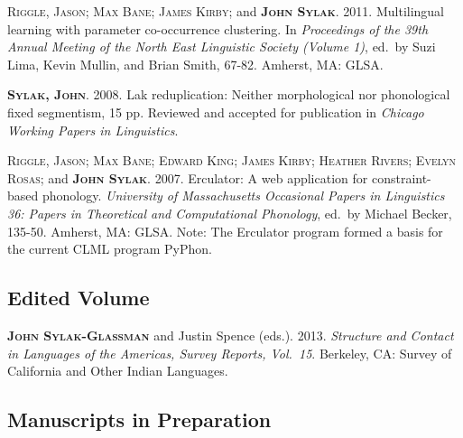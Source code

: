 \documentclass[11pt]{article}
\renewcommand{\bf}[1]{\textbf{#1}}
\newcommand{\ca}[1]{\textsc{#1}}
\renewcommand{\it}[1]{\textit{#1}}
\begin{document}
\begin{reflist}
\ca{Riggle, Jason; Max Bane; James Kirby;} and \ca{\bf{John Sylak}}. 2011. Multilingual learning with parameter co-occurrence clustering. In \it{Proceedings of the 39th Annual Meeting of the North East Linguistic Society (Volume 1)}, ed.~by Suzi Lima, Kevin Mullin, and Brian Smith, 67-82. Amherst, MA: GLSA.

\ca{\bf{Sylak, John}}. 2008. Lak reduplication: Neither morphological nor phonological fixed segmentism, 15 pp. Reviewed and accepted for publication in \it{Chicago Working Papers in Linguistics}.

\ca{Riggle, Jason; Max Bane; Edward King; James Kirby; Heather Rivers; Evelyn Rosas;} and \ca{\bf{John Sylak}}. 2007. Erculator: A web application for constraint-based phonology. \it{University of Massachusetts Occasional Papers in Linguistics 36: Papers in Theoretical and Computational Phonology}, ed.~by Michael Becker, 135-50. Amherst, MA: GLSA. Note: The Erculator program formed a basis for the current CLML program PyPhon.
\end{reflist}

\subsection*{Edited Volume}

\begin{reflist}
\ca{\bf{John Sylak-Glassman}} and Justin Spence (eds.). 2013. \it{Structure and Contact in Languages of the Americas, Survey Reports, Vol.~15}. Berkeley, CA: Survey of California and Other Indian Languages.

\end{reflist}



\subsection*{Manuscripts in Preparation}
\end{document}

